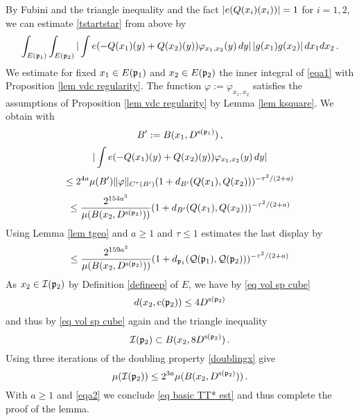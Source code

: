 By Fubini and the triangle inequality and
the fact $|e({Q}(x_i)(x_i))|=1$ for $i=1,2$, we can estimate
\eqref{tstartstar} from above by
\begin{equation}\label{eqa1}
\int_{E(\mathfrak p_1)} \int_{E(\mathfrak p_2)} |\int
e(-{Q}(x_1)(y)+{Q}(x_2)(y))\varphi_{x_1,x_2}(y)
\,dy|\,|g(x_1)g(x_2)|\, dx_1dx_2\,.
\end{equation}
We estimate for fixed $x_1\in E(\mathfrak p_1)$ and
$x_2\in E(\mathfrak p_2)$ the inner integral of \eqref{eqa1} with
Proposition \ref{lem vdc regularity}. The function
$\varphi:=\varphi_{x_1,x_2}$ satisfies the assumptions of
Proposition \ref{lem vdc regularity} by Lemma \ref{lem ksquare}.
We obtain with
\begin{equation}
    B':= B(x_1, D^{\mathrm{s}(\mathfrak p_1)})\, ,
\end{equation}
\begin{equation}
    |\int
e(-{Q}(x_1)(y)+{Q}(x_2)(y))\varphi_{x_1,x_2}(y)
\,dy|
\end{equation}
\begin{equation}
    \le     2^{4a} \mu(B') \|{\varphi}\|_{C^\tau(B')}
        (1 + d_{B'}({Q}(x_1),{Q}(x_2)))^{-\tau^2/(2+a)}
\end{equation}
\begin{equation}
    \le     \frac{2^{154a^3}}
    {\mu(B(x_2, D^{\mathrm{s}(\mathfrak p_2)}))}
        (1 + d_{B'}({Q}(x_1),{Q}(x_2)))^{-\tau^2/(2+a)}
\end{equation}
Using Lemma \ref{lem tgeo} and $a\ge 1$ and $\tau \le 1$ estimates the last display by
\begin{equation}\label{eqa2}
    \le     \frac{2^{159a^3}}
    {\mu(B(x_2, D^{\mathrm{s}(\mathfrak p_2)}))}
        (1+d_{\mathfrak p_1}(\mathcal{Q}(\mathfrak p_1), \mathcal{Q}(\mathfrak p_2)))^{-\tau^2/(2+a)}
\end{equation}
As $x_2\in \mathcal{I}(\mathfrak p_2)$ by Definition \eqref{defineep} of $E$, we have by \eqref{eq vol sp cube}
\begin{equation}
    d(x_2,\mathrm{c}(\mathfrak p_2))\le 4D^{\mathrm{s}(\mathfrak p_2)}
\end{equation}
and thus by \eqref{eq vol sp cube} again and the triangle inequality
\begin{equation}
    \mathcal{I}(\mathfrak p_2)\subset B(x_2,8D^{\mathrm{s}(\mathfrak p_2)})\, .
\end{equation}
Using three iterations of the doubling property \eqref{doublingx} give
\begin{equation}
    \mu(\mathcal{I}(\mathfrak p_2))\le 2^{3a}\mu(B(x_2,D^{\mathrm{s}(\mathfrak p_2)}))\, .
\end{equation}
With $a\ge 1$ and \eqref{eqa2} we conclude \eqref{eq basic TT* est} and thus complete the proof of the lemma.


